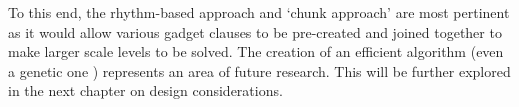 \documentclass[11pt, a4paper, oneside]{report} %
\begin{document}
To this end, the rhythm-based approach
\cite{compton2006procedural,Smith:2009:RLG:1536513.1536548} and `chunk approach'
\cite{mawhorter2010procedural} are most pertinent as it would allow various
gadget clauses to be pre-created and joined together to make larger scale levels
to be solved. The creation of an efficient algorithm (even a genetic one
\cite{mourato2011automatic}) represents an area of future research. This will be
further explored in the next chapter on design considerations.









\end{document}
